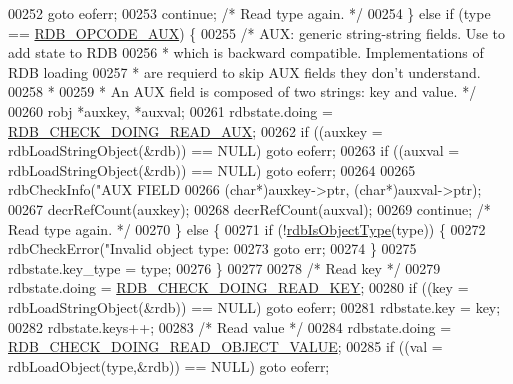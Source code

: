 \begin{DoxyCode}
{{{{{{{{{{00252                 \textcolor{keywordflow}{goto} eoferr;
00253             \textcolor{keywordflow}{continue}; \textcolor{comment}{/* Read type again. */}
00254         \} \textcolor{keywordflow}{else} \textcolor{keywordflow}{if} (type == \hyperlink{rdb_8h_ab0c62f54bb9377a6a75dbe331a2936bd}{RDB\_OPCODE\_AUX}) \{
00255             \textcolor{comment}{/* AUX: generic string-string fields. Use to add state to RDB}
00256 \textcolor{comment}{             * which is backward compatible. Implementations of RDB loading}
00257 \textcolor{comment}{             * are requierd to skip AUX fields they don't understand.}
00258 \textcolor{comment}{             *}
00259 \textcolor{comment}{             * An AUX field is composed of two strings: key and value. */}
00260             robj *auxkey, *auxval;
00261             rdbstate.doing = \hyperlink{redis-check-rdb_8c_a14dfe6627d1d6293301b16939723a12e}{RDB\_CHECK\_DOING\_READ\_AUX};
00262             \textcolor{keywordflow}{if} ((auxkey = rdbLoadStringObject(&rdb)) == NULL) \textcolor{keywordflow}{goto} eoferr;
00263             \textcolor{keywordflow}{if} ((auxval = rdbLoadStringObject(&rdb)) == NULL) \textcolor{keywordflow}{goto} eoferr;
00264 
00265             rdbCheckInfo(\textcolor{stringliteral}{"AUX FIELD %
00266                 (\textcolor{keywordtype}{char}*)auxkey->ptr, (\textcolor{keywordtype}{char}*)auxval->ptr);
00267             decrRefCount(auxkey);
00268             decrRefCount(auxval);
00269             \textcolor{keywordflow}{continue}; \textcolor{comment}{/* Read type again. */}
00270         \} \textcolor{keywordflow}{else} \{
00271             \textcolor{keywordflow}{if} (!\hyperlink{rdb_8h_aab085218231452c8782bd5f7d8011ce2}{rdbIsObjectType}(type)) \{
00272                 rdbCheckError(\textcolor{stringliteral}{"Invalid object type: %
00273                 \textcolor{keywordflow}{goto} err;
00274             \}
00275             rdbstate.key\_type = type;
00276         \}
00277 
00278         \textcolor{comment}{/* Read key */}
00279         rdbstate.doing = \hyperlink{redis-check-rdb_8c_a502536e7d64001543187d790a8dc48af}{RDB\_CHECK\_DOING\_READ\_KEY};
00280         \textcolor{keywordflow}{if} ((key = rdbLoadStringObject(&rdb)) == NULL) \textcolor{keywordflow}{goto} eoferr;
00281         rdbstate.key = key;
00282         rdbstate.keys++;
00283         \textcolor{comment}{/* Read value */}
00284         rdbstate.doing = \hyperlink{redis-check-rdb_8c_ac6a3f6afcf1b09f47ba08a73ae925fc8}{RDB\_CHECK\_DOING\_READ\_OBJECT\_VALUE};
00285         \textcolor{keywordflow}{if} ((val = rdbLoadObject(type,&rdb)) == NULL) \textcolor{keywordflow}{goto} eoferr;
}}}}}}}}}}}}
\end{DoxyCode}
